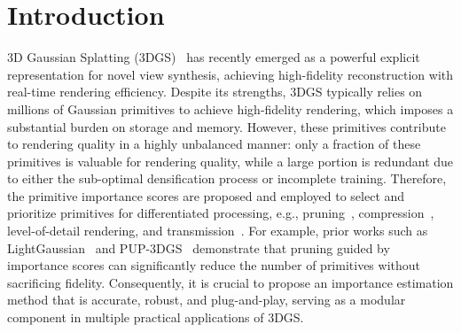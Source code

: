 \section{Introduction}
\label{sec:intro}

3D Gaussian Splatting (3DGS)~\cite{3dgs} has recently emerged as a powerful explicit representation for novel view synthesis, achieving high-fidelity reconstruction with real-time rendering efficiency. Despite its strengths, 3DGS typically relies on millions of Gaussian primitives to achieve high-fidelity rendering, which imposes a substantial burden on storage and memory. However, these primitives contribute to rendering quality in a highly unbalanced manner: only a fraction of these primitives is valuable for rendering quality, while a large portion is redundant due to either the sub-optimal densification process or incomplete training. 
Therefore, the primitive importance scores are proposed and employed to select and prioritize primitives for differentiated processing, e.g., pruning~\cite{lightgaussian, pup}, compression~\cite{scaffold,hacpp,contextgs,maskgaussian,pcgs,yang2024benchmark}, level-of-detail rendering, and transmission~\cite{FLoD,lapisgs, progs}. For example, prior works such as LightGaussian~\cite{lightgaussian} and PUP-3DGS~\cite{pup} demonstrate that pruning guided by importance scores can significantly reduce the number of primitives without sacrificing fidelity. Consequently, it is crucial to propose an importance estimation method that is accurate, robust, and plug-and-play, serving as a modular component in multiple practical applications of 3DGS.


